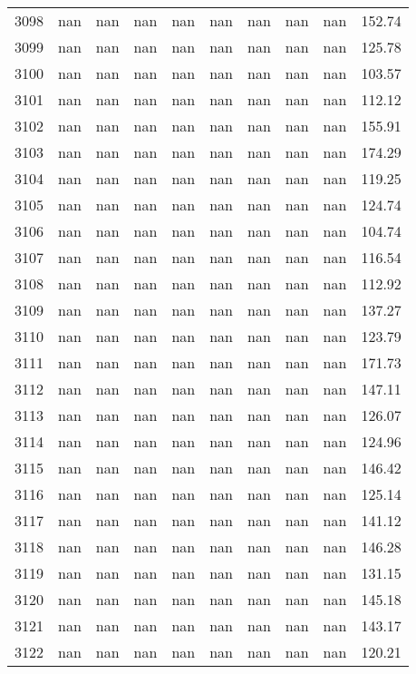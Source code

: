 \begin{tabular}{lrrrrrrrrr}
3098 & nan & nan & nan & nan & nan & nan & nan & nan & 152.74 \\
3099 & nan & nan & nan & nan & nan & nan & nan & nan & 125.78 \\
3100 & nan & nan & nan & nan & nan & nan & nan & nan & 103.57 \\
3101 & nan & nan & nan & nan & nan & nan & nan & nan & 112.12 \\
3102 & nan & nan & nan & nan & nan & nan & nan & nan & 155.91 \\
3103 & nan & nan & nan & nan & nan & nan & nan & nan & 174.29 \\
3104 & nan & nan & nan & nan & nan & nan & nan & nan & 119.25 \\
3105 & nan & nan & nan & nan & nan & nan & nan & nan & 124.74 \\
3106 & nan & nan & nan & nan & nan & nan & nan & nan & 104.74 \\
3107 & nan & nan & nan & nan & nan & nan & nan & nan & 116.54 \\
3108 & nan & nan & nan & nan & nan & nan & nan & nan & 112.92 \\
3109 & nan & nan & nan & nan & nan & nan & nan & nan & 137.27 \\
3110 & nan & nan & nan & nan & nan & nan & nan & nan & 123.79 \\
3111 & nan & nan & nan & nan & nan & nan & nan & nan & 171.73 \\
3112 & nan & nan & nan & nan & nan & nan & nan & nan & 147.11 \\
3113 & nan & nan & nan & nan & nan & nan & nan & nan & 126.07 \\
3114 & nan & nan & nan & nan & nan & nan & nan & nan & 124.96 \\
3115 & nan & nan & nan & nan & nan & nan & nan & nan & 146.42 \\
3116 & nan & nan & nan & nan & nan & nan & nan & nan & 125.14 \\
3117 & nan & nan & nan & nan & nan & nan & nan & nan & 141.12 \\
3118 & nan & nan & nan & nan & nan & nan & nan & nan & 146.28 \\
3119 & nan & nan & nan & nan & nan & nan & nan & nan & 131.15 \\
3120 & nan & nan & nan & nan & nan & nan & nan & nan & 145.18 \\
3121 & nan & nan & nan & nan & nan & nan & nan & nan & 143.17 \\
3122 & nan & nan & nan & nan & nan & nan & nan & nan & 120.21 \\

\end{tabular}
